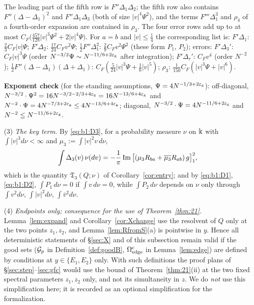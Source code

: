 \noindent The leading part of the fifth row is $F''\Delta_1\Delta_2$; the fifth row also contains $F''(\Delta-\Delta_1)^2$ and $F''\Delta_1\Delta_3$
(both of size $|v|^4\Psi^2$), and the terms $F'''\Delta_1^3$ and $\rho_4$ of a fourth-order expansion are contained in $\rho_3$. The four error rows add up to at most
$C_F\big(\frac{457}{128}|v|^3\Psi^2+2|v|^4\Psi\big)$. For $a=b$ and $|v|\le\frac14$ the corresponding list is: $F'\Delta_1$: $\frac23C_F|v|\Psi$; $F'\Delta_2$: $\frac{17}{24}C_Fv^2\Psi$;
$\frac12F''\Delta_1^2$: $\frac29C_Fv^2\Psi^2$ (these form $P_1$, $P_2$); errors: $F'\Delta_3'$: $C_F|v|^3\Psi$ (order $N^{-3/2}\Psi\sim N^{-11/6+2\varepsilon_{\mathrm g}}$ after integration);
$F'\Delta_r'$: $C_Fv^4$ (order $N^{-2}$); $\frac12F''(\Delta-\Delta_1)(\Delta+\Delta_1)$: $C_F(\frac5{24}|v|^3\Psi+\frac16|v|^5)$; $\rho_3$: $\frac1{150}C_F(|v|^3\Psi+|v|^6)$.

\textbf{Exponent check} (for the standing assumptions, $\Psi=4N^{-1/3+2\varepsilon_{\mathrm g}}$): off-diagonal, $N^{-3/2}\cdot\Psi^2=16N^{-3/2-2/3+4\varepsilon_{\mathrm g}}=16N^{-13/6+4\varepsilon_{\mathrm g}}$ and
$N^{-2}\cdot\Psi=4N^{-7/3+2\varepsilon_{\mathrm g}}\le4N^{-13/6+4\varepsilon_{\mathrm g}}$; diagonal, $N^{-3/2}\cdot\Psi=4N^{-11/6+2\varepsilon_{\mathrm g}}$ and $N^{-2}\le N^{-11/6+2\varepsilon_{\mathrm g}}$.

(3) \emph{The key term.} By \eqref{eq:b1:D3}, for a probability measure $\nu$ on $\Bbbk$ with $\int|v|^3d\nu<\infty$ and $\mu_3:=\int|v|^2v\,d\nu$,
\[
\int\Delta_3(v)\,\nu(dv)=-\frac1\pi\operatorname{Im}\big[(\mu_3R_{ba}+\overline{\mu_3}R_{ab})\,g\big]_{1}^{2} ,
\]
which is the quantity $\mathfrak T_3(Q;\nu)$ of Corollary~\ref{cor:entry}; and by \eqref{eq:b1:D1}, \eqref{eq:b1:D2}, $\int P_1\,d\nu=0$ if $\int v\,d\nu=0$, while $\int P_2\,d\nu$ depends on
$\nu$ only through $\int v^2d\nu$, $\int|v|^2d\nu$, $\int\bar v^2d\nu$.

(4) \emph{Endpoints only; consequence for the use of Theorem~\ref{thm:21}.} Lemma~\ref{lem:expand} and Corollary~\ref{cor:Xchange} use the resolvent of $Q$ only at the two points
$z_1,z_2$, and Lemma~\ref{lem:RfromS}(a) is pointwise in $y$. Hence all deterministic statements of \S\ref{sec:X} and of this subsection remain valid if the good sets
($\mathcal{G}_p$ in Definition~\ref{def:goodB}, $\Omega_{\rm edge}^c$ in Lemma~\ref{lem:edge}) are defined by conditions at $y\in\{E_1,E_2\}$ only. With such definitions the proof plans of \S\ref{sec:step}--\ref{sec:gfc} would use
the bound of Theorem~\ref{thm:21}(ii) at the two fixed spectral parameters $z_1,z_2$ only, and not its simultaneity in $z$. We do \emph{not} use this simplification here;
it is recorded as an optional simplification for the formalization.
